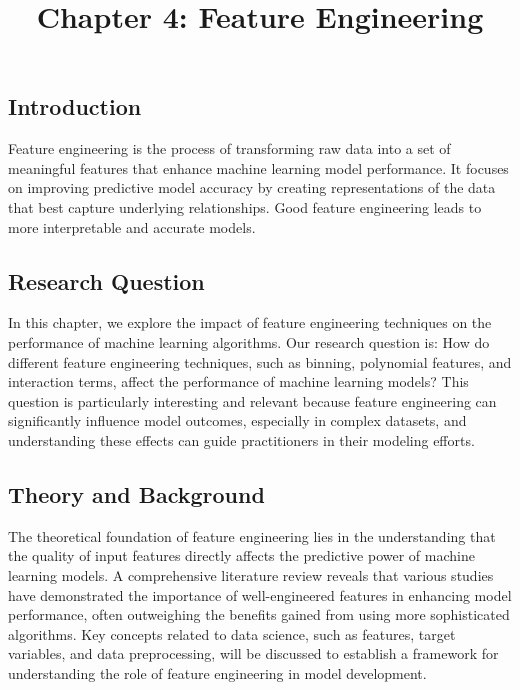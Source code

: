 \documentclass{article}
\begin{document}
\setcounter{section}{4} %
\setcounter{subsection}{0}

\title{Chapter 4: Feature Engineering}
\date{}
\maketitle


\subsection*{Introduction}
Feature engineering is the process of transforming raw data into a set of meaningful features that enhance machine learning model performance. It focuses on improving predictive model accuracy by creating representations of the data that best capture underlying relationships. Good feature engineering leads to more interpretable and accurate models.

\subsection*{Research Question}
In this chapter, we explore the impact of feature engineering techniques on the performance of machine learning algorithms. Our research question is: How do different feature engineering techniques, such as binning, polynomial features, and interaction terms, affect the performance of machine learning models? This question is particularly interesting and relevant because feature engineering can significantly influence model outcomes, especially in complex datasets, and understanding these effects can guide practitioners in their modeling efforts.

\subsection*{Theory and Background}
The theoretical foundation of feature engineering lies in the understanding that the quality of input features directly affects the predictive power of machine learning models. A comprehensive literature review reveals that various studies have demonstrated the importance of well-engineered features in enhancing model performance, often outweighing the benefits gained from using more sophisticated algorithms. Key concepts related to data science, such as features, target variables, and data preprocessing, will be discussed to establish a framework for understanding the role of feature engineering in model development.
\end{document}
